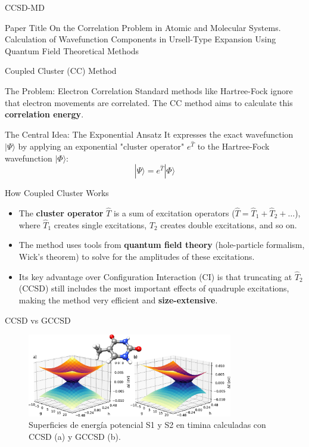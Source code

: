 \begin{frame}{CCSD-MD}
	\begin{block}{Paper Title}
	On the Correlation Problem in Atomic and Molecular Systems. Calculation of Wavefunction Components in Ursell-Type Expansion Using Quantum Field Theoretical Methods 
	\end{block}
\end{frame}


\begin{frame}{Coupled Cluster (CC) Method}
    \begin{block}{The Problem: Electron Correlation}
        Standard methods like Hartree-Fock ignore that electron movements are correlated. The CC method aims to calculate this \textbf{correlation energy}.
    \end{block}
    \pause

    \begin{alertblock}{The Central Idea: The Exponential Ansatz}
        It expresses the exact wavefunction $|\Psi\rangle$ by applying an exponential "cluster operator" $e^{\hat{T}}$ to the Hartree-Fock wavefunction $|\Phi\rangle$:
        \[
        |\Psi\rangle = e^{\hat{T}} |\Phi\rangle
        \]
    \end{alertblock}
\end{frame}


\begin{frame}{How Coupled Cluster Works}
    \begin{itemize}
        \item The \textbf{cluster operator} $\hat{T}$ is a sum of excitation operators ($\hat{T} = \hat{T}_1 + \hat{T}_2 + \dots$), where $\hat{T}_1$ creates single excitations, $\hat{T}_2$ creates double excitations, and so on.
        \pause
        \bigskip
        \item The method uses tools from \textbf{quantum field theory} (hole-particle formalism, Wick's theorem) to solve for the amplitudes of these excitations.
        \pause
        \bigskip
        \item Its key advantage over Configuration Interaction (CI) is that truncating at $\hat{T}_2$ (CCSD) still includes the most important effects of quadruple excitations, making the method very efficient and \textbf{size-extensive}.
    \end{itemize}
\end{frame}

\begin{frame}{CCSD vs GCCSD}
    \begin{figure}
        \includegraphics[width=0.8\textwidth]{images/CCSD.jpeg}
        \caption{Superficies de energía potencial S1 y S2 en timina calculadas con CCSD (a) y GCCSD (b).}
    \end{figure}
\end{frame}
